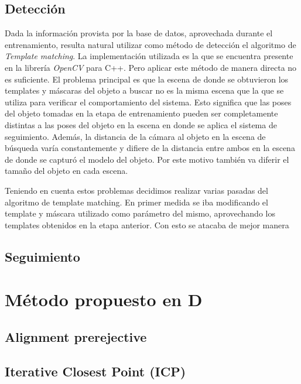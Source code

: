 \subsection{Detección}
Dada la información provista por la base de datos, aprovechada durante el entrenamiento, resulta natural utilizar como método de detección el algoritmo de \textit{Template matching}.  La implementación utilizada es la que se encuentra presente en la librería \textit{OpenCV} para C++. Pero aplicar este método de manera directa no es suficiente. El problema principal es que la escena de donde se obtuvieron los templates y máscaras del objeto a buscar no es la misma escena que la que se utiliza para verificar el comportamiento del sistema. Esto significa que las poses del objeto tomadas en la etapa de entrenamiento pueden ser completamente distintas a las poses del objeto en la escena en donde se aplica el sistema de seguimiento. Además, la distancia de la cámara al objeto en la escena de búsqueda varía constantemente y difiere de la distancia entre ambos en la escena de donde se capturó el modelo del objeto. Por este motivo también va diferir el tamaño del objeto en cada escena.

Teniendo en cuenta estos problemas decidimos realizar varias pasadas del algoritmo de template matching. En primer medida se iba modificando el template y máscara utilizado como parámetro del mismo, aprovechando los templates obtenidos en la etapa anterior. Con esto se atacaba de mejor manera 

\subsection{Seguimiento}\label{tracking_rgb}

\section{Método propuesto en D}
\subsection{Alignment prerejective}\label{alignment_prerejective}

\subsection{Iterative Closest Point (ICP)}\label{ICP}

